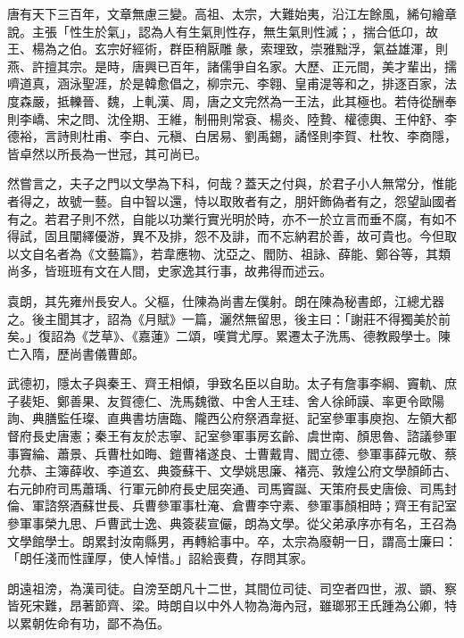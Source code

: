 
\begin{pinyinscope}

 唐有天下三百年，文章無慮三變。高祖、太宗，大難始夷，沿江左餘風，絺句繪章說。主張「性生於氣」，認為人有生氣則性存，無生氣則性滅；，揣合低卬，故王、楊為之伯。玄宗好經術，群臣稍厭雕彖，索理致，崇雅黜浮，氣益雄渾，則燕、許擅其宗。是時，唐興已百年，諸儒爭自名家。大歷、正元間，美才輩出，擩嚌道真，涵泳聖涯，於是韓愈倡之，柳宗元、李翱、皇甫湜等和之，排逐百家，法度森嚴，抵轢晉、魏，上軋漢、周，唐之文完然為一王法，此其極也。若侍從酬奉則李嶠、宋之問、沈佺期、王維，制冊則常袞、楊炎、陸贄、權德輿、王仲舒、李德裕，言詩則杜甫、李白、元稹、白居易、劉禹錫，譎怪則李賀、杜牧、李商隱，皆卓然以所長為一世冠，其可尚已。



 然嘗言之，夫子之門以文學為下科，何哉？蓋天之付與，於君子小人無常分，惟能者得之，故號一藝。自中智以還，恃以取敗者有之，朋奸飾偽者有之，怨望訕國者有之。若君子則不然，自能以功業行實光明於時，亦不一於立言而垂不腐，有如不得試，固且闡繹優游，異不及排，怨不及誹，而不忘納君於善，故可貴也。今但取以文自名者為《文藝篇》，若韋應物、沈亞之、閻防、祖詠、薛能、鄭谷等，其類尚多，皆班班有文在人間，史家逸其行事，故弗得而述云。



 袁朗，其先雍州長安人。父樞，仕陳為尚書左僕射。朗在陳為秘書郎，江總尤器之。後主聞其才，詔為《月賦》一篇，灑然無留思，後主曰：「謝莊不得獨美於前矣。」復詔為《芝草》、《嘉蓮》二頌，嘆賞尤厚。累遷太子洗馬、德教殿學士。陳亡入隋，歷尚書儀曹郎。



 武德初，隱太子與秦王、齊王相傾，爭致名臣以自助。太子有詹事李綱、竇軌、庶子裴矩、鄭善果、友賀德仁、洗馬魏徵、中舍人王珪、舍人徐師謨、率更令歐陽詢、典膳監任璨、直典書坊唐臨、隴西公府祭酒韋挺、記室參軍事庾抱、左領大都督府長史唐憲；秦王有友於志寧、記室參軍事房玄齡、虞世南、顏思魯、諮議參軍事竇綸、蕭景、兵曹杜如晦、鎧曹褚遂良、士曹戴胄、閻立德、參軍事薛元敬、蔡允恭、主簿薛收、李道玄、典簽蘇干、文學姚思廉、褚亮、敦煌公府文學顏師古、右元帥府司馬蕭瑀、行軍元帥府長史屈突通、司馬竇誕、天策府長史唐儉、司馬封倫、軍諮祭酒蘇世長、兵曹參軍事杜淹、倉曹李守素、參軍事顏相時；齊王有記室參軍事榮九思、戶曹武士逸、典簽裴宣儼，朗為文學。從父弟承序亦有名，王召為文學館學士。朗累封汝南縣男，再轉給事中。卒，太宗為廢朝一日，謂高士廉曰：「朗任淺而性謹厚，使人悼惜。」詔給喪費，存問其家。



 朗遠祖滂，為漢司徒。自滂至朗凡十二世，其間位司徒、司空者四世，淑、顗、察皆死宋難，昂著節齊、梁。時朗自以中外人物為海內冠，雖瑯邪王氏踵為公卿，特以累朝佐命有功，鄙不為伍。




\end{pinyinscope}

